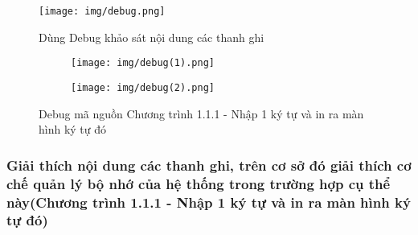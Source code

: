 \documentclass{article}
\begin{document}
\begin{figure}[H]
    \centering
    \texttt{[image: img/debug.png]}
    \caption{Dùng Debug khảo sát nội dung các thanh ghi}
    \label{fig:before_input}
\end{figure}

\begin{figure}[H]
    \centering
    \begin{subfigure}[b]{0.7\textwidth}
        \centering
        \texttt{[image: img/debug(1).png]}
    \end{subfigure}
    \hfill
    \begin{subfigure}[b]{0.7\textwidth}
        \centering
        \texttt{[image: img/debug(2).png]}
    \end{subfigure}
    \caption{Debug mã nguồn Chương trình 1.1.1 - Nhập 1 ký tự và in ra màn hình ký tự đó}
    \label{fig:before_input}
\end{figure}

\subsubsection{Giải thích nội dung các thanh ghi, trên cơ sở đó giải thích cơ chế quản lý bộ nhớ của hệ thống trong trường hợp cụ thể này(Chương trình 1.1.1 - Nhập 1 ký tự và in ra màn hình ký tự đó)}
\end{document}
